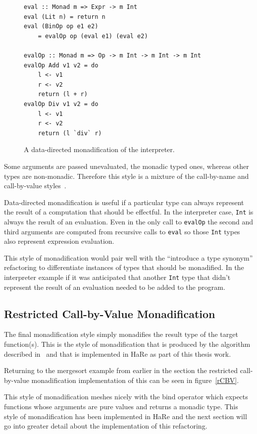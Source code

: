 \begin{figure}[t]
\begin{lstlisting}
eval :: Monad m => Expr -> m Int
eval (Lit n) = return n
eval (BinOp op e1 e2)
	= evalOp op (eval e1) (eval e2)
	
evalOp :: Monad m => Op -> m Int -> m Int -> m Int
evalOp Add v1 v2 = do 
	l <- v1
	r <- v2	
	return (l + r)
evalOp Div v1 v2 = do
	l <- v1
	r <- v2
	return (l `div` r)
\end{lstlisting}
\caption{A data-directed monadification of the interpreter.}
\label{fig:monInterp}
\end{figure}

Some arguments are passed unevaluated, the monadic typed ones, whereas other types are non-monadic. Therefore this style is a mixture of the call-by-name and call-by-value styles~\citep{monadSurvey}. 

Data-directed monadification is useful if a particular type can always represent the result of a computation that should be effectful. In the interpreter case, \texttt{Int} is always the result of an evaluation. Even in the only call to \texttt{evalOp} the second and third arguments are computed from recursive calls to \texttt{eval} so those \texttt{Int} types also represent expression evaluation.

This style of monadification would pair well with the ``introduce a type synonym'' refactoring to differentiate instances of types that should be monadified. In the interpreter example if it was anticipated that another \texttt{Int} type that didn't represent the result of an evaluation needed to be added to the program.

\subsection{Restricted Call-by-Value Monadification}

The final monadification style simply monadifies the result type of the target function(s). This is the style of monadification that is produced by the algorithm described in~\citep{monadification} and that is implemented in HaRe as part of this thesis work.

Returning to the mergesort example from earlier in the section the restricted call-by-value monadification implementation of this can be seen in figure~\ref{rCBV}.

This style of monadification meshes nicely with the bind operator which expects functions whose arguments are pure values and returns a monadic type. This style of monadification has been implemented in HaRe and the next section will go into greater detail about the implementation of this refactoring.

